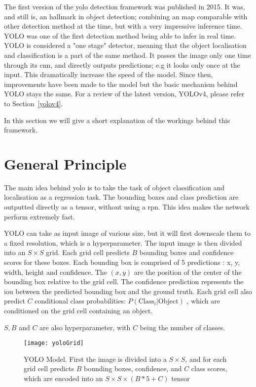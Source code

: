 The first version of the \gls{yolo} detection framework was published in 2015\cite{yolo}. It was, and still is, an hallmark in object detection; combining an \gls{map} comparable with other detection method at the time, but with a very impressive inference time. YOLO was one of the first detection method being able to infer in real time. YOLO is considered a "one stage" detector, meaning that the object localisation and classification is a part of the same method. It passes the image only one time through its \gls{cnn}, and directly outputs predictions; e.g it looks only once at the input. This dramatically increase the speed of the model. Since then, improvements\cite{yolov9000}\cite{yolov3} have been made to the model but the basic mechanism behind YOLO stays the same. For a review of the latest version, YOLOv4\cite{yolov4}, please refer to Section~\ref{yolov4}.  

In this section we will give a short explanation of the workings behind this framework.

\section{General Principle}
The main idea behind \gls{yolo} is to take the task of object classification and localisation as a regression task. The bounding boxes and class prediction are outputted directly as a tensor, without using a \gls{rpn}. This idea makes the network perform extremely fast.


YOLO can take as input image of various size, but it will first downscale them to a fixed resolution, which is a \gls{hyperparameter}. The input image is then divided into an $S \times S$ grid. Each grid cell predicts $B$ bounding boxes and confidence scores for these boxes. Each bounding box is comprised of 5 predictions : x, y, width, height and confidence. The $(x,y)$ are the position of the center of the bounding box relative to the grid cell. The confidence prediction represents the \gls{iou} between the predicted bounding box and the ground truth. Each grid cell also predict $C$ conditional class probabilities: $P(\text{Class}_i|\text{Object})$ , which are conditioned on the grid cell containing an object. 

$S, B$ and $C$ are also \gls{hyperparameter}, with $C$ being the number of classes. 

\begin{figure}[h!]
  \centering
  \texttt{[image: yoloGrid]}
	\caption[YOLO model]{YOLO Model. First the image is divided into a $S \times S$, and for each grid cell predicts $B$ bounding boxes, confidence, and $C$ class scores, which are encoded into an $S \times S \times (B * 5 + C)$ tensor}
  \label{fig:yoloModel}
\end{figure}

